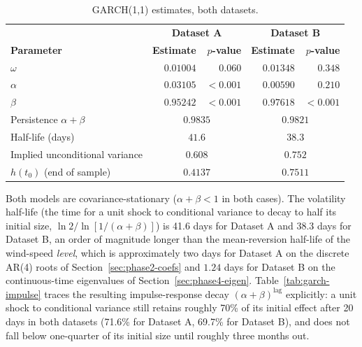 \documentclass[11pt, a4paper, twoside]{article}
\begin{document}
\begin{table}[htbp]
\centering
\caption{GARCH(1,1) estimates, both datasets.}
\label{tab:garch}
\begin{tabular}{l r r r r}
\toprule
& \multicolumn{2}{c}{\textbf{Dataset A}} & \multicolumn{2}{c}{\textbf{Dataset B}} \\
\textbf{Parameter} & \textbf{Estimate} & \textbf{$p$-value} & \textbf{Estimate} & \textbf{$p$-value} \\
\midrule
$\omega$ & $0.01004$ & $0.060$ & $0.01348$ & $0.348$ \\
$\alpha$ & $0.03105$ & $<0.001$ & $0.00590$ & $0.210$ \\
$\beta$ & $0.95242$ & $<0.001$ & $0.97618$ & $<0.001$ \\
\midrule
Persistence $\alpha + \beta$ & \multicolumn{2}{c}{$0.9835$} & \multicolumn{2}{c}{$0.9821$} \\
Half-life (days) & \multicolumn{2}{c}{$41.6$} & \multicolumn{2}{c}{$38.3$} \\
Implied unconditional variance & \multicolumn{2}{c}{$0.608$} & \multicolumn{2}{c}{$0.752$} \\
$h(t_0)$ (end of sample) & \multicolumn{2}{c}{$0.4137$} & \multicolumn{2}{c}{$0.7511$} \\
\bottomrule
\end{tabular}
\end{table}

Both models are covariance-stationary ($\alpha + \beta < 1$ in both cases). The volatility half-life (the time for a unit shock to conditional variance to decay to half its initial size, $\ln 2 / \ln[1/(\alpha+\beta)]$) is 41.6 days for Dataset A and 38.3 days for Dataset B, an order of magnitude longer than the mean-reversion half-life of the wind-speed \emph{level}, which is approximately two days for Dataset A on the discrete AR(4) roots of Section~\ref{sec:phase2-coefs} and $1.24$ days for Dataset B on the continuous-time eigenvalues of Section~\ref{sec:phase4-eigen}. Table~\ref{tab:garch-impulse} traces the resulting impulse-response decay $(\alpha+\beta)^{\text{lag}}$ explicitly: a unit shock to conditional variance still retains roughly 70\% of its initial effect after 20 days in both datasets (71.6\% for Dataset A, 69.7\% for Dataset B), and does not fall below one-quarter of its initial size until roughly three months out.
\end{document}
